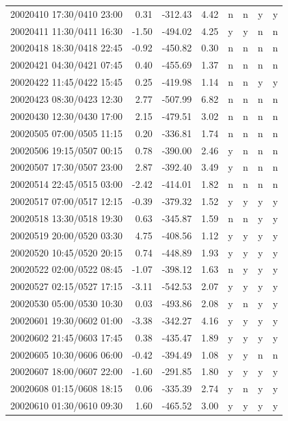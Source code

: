 \documentclass[linenumbers,draft]{agujournal}
\begin{document}
\begin{center}
\begin{longtable}{l|rcc|cccc}
20020410 17:30/0410 23:00 & 0.31 & -312.43 & 4.42 & n & n & y & y \\
20020411 11:30/0411 16:30 & -1.50 & -494.02 & 4.25 & y & y & n & n \\
20020418 18:30/0418 22:45 & -0.92 & -450.82 & 0.30 & n & n & n & n \\
20020421 04:30/0421 07:45 & 0.40 & -455.69 & 1.37 & n & n & n & n \\
20020422 11:45/0422 15:45 & 0.25 & -419.98 & 1.14 & n & n & y & y \\
20020423 08:30/0423 12:30 & 2.77 & -507.99 & 6.82 & n & n & n & n \\
20020430 12:30/0430 17:00 & 2.15 & -479.51 & 3.02 & n & n & n & n \\
20020505 07:00/0505 11:15 & 0.20 & -336.81 & 1.74 & n & n & n & n \\
20020506 19:15/0507 00:15 & 0.78 & -390.00 & 2.46 & y & n & n & n \\
20020507 17:30/0507 23:00 & 2.87 & -392.40 & 3.49 & y & n & n & n \\
20020514 22:45/0515 03:00 & -2.42 & -414.01 & 1.82 & n & n & n & n \\
20020517 07:00/0517 12:15 & -0.39 & -379.32 & 1.52 & y & y & y & y \\
20020518 13:30/0518 19:30 & 0.63 & -345.87 & 1.59 & n & n & y & y \\
20020519 20:00/0520 03:30 & 4.75 & -408.56 & 1.12 & y & y & y & y \\
20020520 10:45/0520 20:15 & 0.74 & -448.89 & 1.93 & y & y & y & y \\
20020522 02:00/0522 08:45 & -1.07 & -398.12 & 1.63 & n & y & y & y \\
20020527 02:15/0527 17:15 & -3.11 & -542.53 & 2.07 & y & y & y & y \\
20020530 05:00/0530 10:30 & 0.03 & -493.86 & 2.08 & y & n & y & y \\
20020601 19:30/0602 01:00 & -3.38 & -342.27 & 4.16 & y & y & y & y \\
20020602 21:45/0603 17:45 & 0.38 & -435.47 & 1.89 & y & y & y & y \\
20020605 10:30/0606 06:00 & -0.42 & -394.49 & 1.08 & y & y & n & n \\
20020607 18:00/0607 22:00 & -1.60 & -291.85 & 1.80 & y & y & y & y \\
20020608 01:15/0608 18:15 & 0.06 & -335.39 & 2.74 & y & n & y & y \\
20020610 01:30/0610 09:30 & 1.60 & -465.52 & 3.00 & y & y & y & y \\

\end{longtable}
\end{center}
\end{document}
